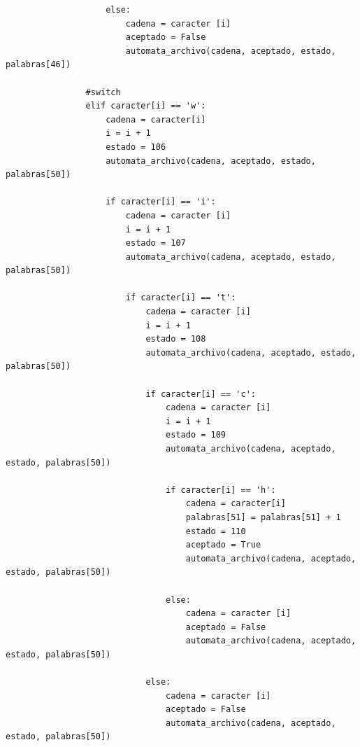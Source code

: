 \documentclass{article}
\begin{document}
\begin{flushleft}
\begin{lstlisting}
                    else:
                        cadena = caracter [i]
                        aceptado = False
                        automata_archivo(cadena, aceptado, estado, palabras[46])
                    
                #switch
                elif caracter[i] == 'w':
                    cadena = caracter[i]
                    i = i + 1
                    estado = 106
                    automata_archivo(cadena, aceptado, estado, palabras[50])
                    
                    if caracter[i] == 'i':
                        cadena = caracter [i]
                        i = i + 1
                        estado = 107
                        automata_archivo(cadena, aceptado, estado, palabras[50])              
                        
                        if caracter[i] == 't':
                            cadena = caracter [i]
                            i = i + 1
                            estado = 108
                            automata_archivo(cadena, aceptado, estado, palabras[50])
                            
                            if caracter[i] == 'c':
                                cadena = caracter [i]
                                i = i + 1
                                estado = 109
                                automata_archivo(cadena, aceptado, estado, palabras[50])
                                
                                if caracter[i] == 'h':
                                    cadena = caracter[i]
                                    palabras[51] = palabras[51] + 1
                                    estado = 110
                                    aceptado = True
                                    automata_archivo(cadena, aceptado, estado, palabras[50])
                                    
                                else:
                                    cadena = caracter [i]
                                    aceptado = False
                                    automata_archivo(cadena, aceptado, estado, palabras[50])
                            
                            else:
                                cadena = caracter [i]
                                aceptado = False
                                automata_archivo(cadena, aceptado, estado, palabras[50])
                                

\end{lstlisting}
\end{flushleft}
\end{document}
